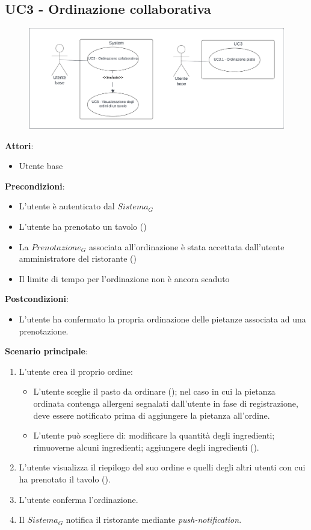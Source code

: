 \subsection{UC3 - Ordinazione collaborativa}\label{usecase:3}

\begin{figure}[H]
    \centering
    \includegraphics[width=0.9\linewidth]{ucd/UCD3_nuovo.png}
\end{figure}

\textbf{Attori}:
\begin{itemize}
    \item Utente base
\end{itemize}
\textbf{Precondizioni}:
\begin{itemize}
    \item L'utente è autenticato dal $\textit{Sistema}_G$ 
    \item L'utente ha prenotato un tavolo ()
    \item La $\textit{Prenotazione}_G$ associata all'ordinazione è stata accettata dall'utente amministratore del ristorante ()
    \item Il limite di tempo per l'ordinazione non è ancora scaduto
\end{itemize}
\textbf{Postcondizioni}:
\begin{itemize}
    \item L'utente ha confermato la propria ordinazione delle pietanze associata ad una prenotazione.
\end{itemize}
\textbf{Scenario principale}:
\begin{enumerate}
    \item L'utente crea il proprio ordine:
    \begin{itemize}
    \item L'utente sceglie il pasto da ordinare (); nel caso in cui la pietanza ordinata contenga allergeni segnalati dall'utente in fase di registrazione, deve essere notificato prima di  aggiungere la pietanza all'ordine.
    \item L'utente può scegliere di: modificare la quantità degli ingredienti; rimuoverne alcuni ingredienti; aggiungere degli ingredienti ().
    \end{itemize}
    \item L'utente visualizza il riepilogo del suo ordine e quelli degli altri utenti con cui ha prenotato il tavolo ().
    \item L'utente conferma l'ordinazione.
    \item Il $\textit{Sistema}_G$ notifica il ristorante mediante \textit{push-notification}.
\end{enumerate}


